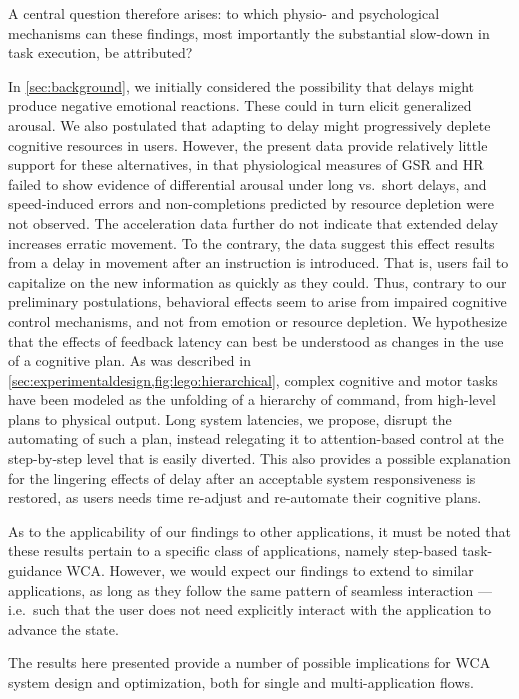 \documentclass[10pt,letterpaper]{article}
\begin{document}
A central question therefore arises: to which physio- and psychological mechanisms can these findings, most importantly the substantial slow-down in task execution, be attributed?

In \cref{sec:background}, we initially considered the possibility that delays might produce negative emotional reactions.
These could in turn elicit generalized arousal.
We also postulated that adapting to delay might progressively deplete cognitive resources in users.
However, the present data provide relatively little support for these alternatives, in that physiological measures of GSR and HR failed to show evidence of differential arousal under long vs.\ short delays, and speed-induced errors and non-completions predicted by resource depletion were not observed.
The acceleration data further do not indicate that extended delay increases erratic movement.
To the contrary, the data suggest this effect results from a delay in movement after an instruction is introduced.
That is, users fail to capitalize on the new information as quickly as they could.
Thus, contrary to our preliminary postulations, behavioral effects seem to arise from impaired cognitive control mechanisms, and not from emotion or resource depletion.
We hypothesize that the effects of feedback latency can best be understood as changes in the use of a cognitive plan.
As was described in \cref{sec:experimentaldesign,fig:lego:hierarchical}, complex cognitive and motor tasks have been modeled as the unfolding of a hierarchy of command, from high-level plans to physical output.
Long system latencies, we propose, disrupt the automating of such a plan, instead relegating it to attention-based control at the step-by-step level that is easily diverted.
This also provides a possible explanation for the lingering effects of delay after an acceptable system responsiveness is restored, as users needs time re-adjust and re-automate their cognitive plans.

As to the applicability of our findings to other applications, it must be noted that these results pertain to a specific class of applications, namely step-based task-guidance WCA.\@
However, we would expect our findings to extend to similar applications, as long as they follow the same pattern of seamless interaction --- i.e.\ such that the user does not need explicitly interact with the application to advance the state.

The results here presented provide a number of possible implications for WCA system design and optimization, both for single and multi-application flows.
\end{document}
